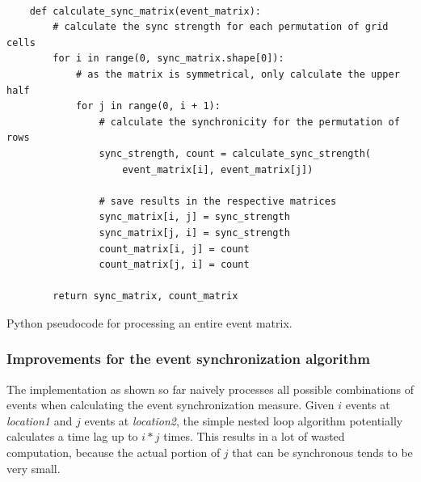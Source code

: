 \begin{listing}[H]
  \begin{verbatim}

    def calculate_sync_matrix(event_matrix):
        # calculate the sync strength for each permutation of grid cells
        for i in range(0, sync_matrix.shape[0]):
            # as the matrix is symmetrical, only calculate the upper half
            for j in range(0, i + 1):
                # calculate the synchronicity for the permutation of rows
                sync_strength, count = calculate_sync_strength(
                    event_matrix[i], event_matrix[j])

                # save results in the respective matrices
                sync_matrix[i, j] = sync_strength
                sync_matrix[j, i] = sync_strength
                count_matrix[i, j] = count
                count_matrix[j, i] = count

        return sync_matrix, count_matrix

  \end{verbatim}
  \caption{Python pseudocode for processing an entire event matrix.}
  \label{lst:sync_matrix}
\end{listing}

\subsubsection{Improvements for the event synchronization algorithm}
The implementation as shown so far naively processes all possible combinations of events when calculating the event synchronization measure. Given $i$ events at \textit{location1} and $j$ events at \textit{location2}, the simple nested loop algorithm potentially calculates a time lag up to $i * j$ times. This results in a lot of wasted computation, because the actual portion of $j$ that can be synchronous tends to be very small.

